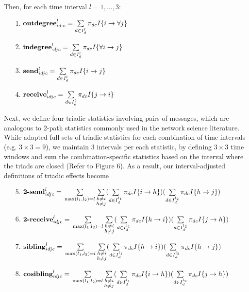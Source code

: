 \documentclass[twoside]{article}
\begin{document}
    Then, for each time interval $l=1,\ldots,3$:
    \begin{itemize}
    	\item [1.]  $\mbox{\textbf{outdegree}}^l_{id\cdot c}=\sum\limits_{d \in I_{d}^{l}}\pi_{dc}I\{i\rightarrow \forall j\}$
    	\item [2.] $\mbox{\textbf{indegree}}^l_{\cdot dj c}=\sum\limits_{d \in I_{d}^{l}}\pi_{dc}I\{\forall i \rightarrow j\}$	 	 	
    	\item [3.]  $\mbox{\textbf{send}}^l_{idjc}=\sum\limits_{d \in I_{d}^{l}}\pi_{dc} I\{i\rightarrow j\}$
    	\item [4.] $\mbox{\textbf{receive}}^l_{idjc}=\sum\limits_{d\in I_{d}^{l}}\pi_{dc} I\{j\rightarrow i\}$
    \end{itemize}
    Next, we define four triadic statistics involving pairs of messages, which are analogous to 2-path statistics commonly used in the network science literature. While \cite{PerryWolfe2012} adapted full sets of triadic statistics for each combination of time intervals (e.g. $3 \times 3=9$), we maintain 3 intervals per each statistic, by defining $3 \times 3$ time windows and sum the combination-specific statistics based on the interval where the triads are closed (Refer to Figure 6). As a result, our interval-adjusted definitions of triadic effects become
    \begin{itemize}
    	\footnotesize
    	\item [5.] $\mbox{\textbf{2-send}}^l_{idjc}=\vspace{3mm}\\\sum\limits_{\substack{\max(l_1,l_2)= l} }\sum\limits_{\substack{h \neq i\\h \neq  j} }(\sum\limits_{d\in I_{d}^{l_1}}\pi_{dc} I\{i\rightarrow h\})(\sum\limits_{d\in I_{d}^{l_2}}\pi_{dc}I\{h\rightarrow j\})$\\
    	\item [6.] $\mbox{\textbf{2-receive}}^l_{idjc}=\vspace{3mm}\\\sum\limits_{\substack{\max(l_1,l_2)= l} }\sum\limits_{\substack{h \neq i\\h \neq  j} }(\sum\limits_{d \in I_{d}^{l_1}}\pi_{dc} I\{h\rightarrow i\})(\sum\limits_{d\in I_{d}^{l_2}}\pi_{dc} I\{j\rightarrow h\})$
    	\item [7.] $\mbox{\textbf{sibling}}^l_{idjc}=\vspace{3mm}\\\sum\limits_{\substack{\max(l_1,l_2)= l} }\sum\limits_{\substack{h \neq i\\h \neq  j} }(\sum\limits_{d\in I_{d}^{l_1}}\pi_{dc} I\{h\rightarrow i\}) (\sum\limits_{d\in I_{d}^{l_2}}\pi_{dc}I\{h\rightarrow j\})$
    	\item [8.] $\mbox{\textbf{cosibling}}^l_{idjc}=\vspace{3mm}\\\sum\limits_{\substack{\max(l_1,l_2)= l}}\sum\limits_{\substack{h \neq i\\h \neq  j} }(\sum\limits_{d \in I_{d}^{l_1}}\pi_{dc} I\{i\rightarrow h\})(\sum\limits_{d\in I_{d}^{l_2}}\pi_{dc}I\{j\rightarrow h\})$
    \end{itemize}
\end{document}
